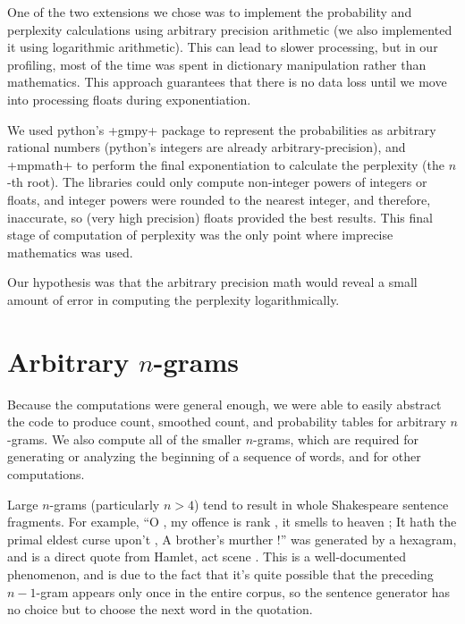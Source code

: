 \documentclass{article}
\newcommand{\osn}{\oldstylenums}
\begin{document}
		One of the two extensions we chose was to implement the probability and
		perplexity calculations using arbitrary precision arithmetic (we also
		implemented it using logarithmic arithmetic).  This can lead to slower
		processing, but in our profiling, most of the time was spent in
		dictionary manipulation rather than mathematics.  This approach
		guarantees that there is no data loss until we move into processing
		floats during exponentiation.

		We used python's +gmpy+ package to represent the probabilities as
		arbitrary rational numbers (python's integers are already
		arbitrary-precision), and +mpmath+ to perform the final exponentiation
		to calculate the perplexity (the $n$-th root).  The libraries could only
		compute non-integer powers of integers or floats, and integer powers
		were rounded to the nearest integer, and therefore, inaccurate, so
		(very high precision) floats provided the best results.  This final
		stage of computation of perplexity was the only point where imprecise
		mathematics was used.

		Our hypothesis was that the arbitrary precision math would reveal a
		small amount of error in computing the perplexity logarithmically.

	\section*{Arbitrary $n$-grams}
	
		Because the computations were general enough, we were able to easily
		abstract the code to produce count, smoothed count, and probability
		tables for arbitrary $n$-grams.  We also compute all of the smaller
		$n$-grams, which are required for generating or analyzing the beginning
		of a sequence of words, and for other computations.

		Large $n$-grams (particularly $n > 4$) tend to result in whole
		Shakespeare sentence fragments.  For example, ``O , my offence is rank ,
		it smells to heaven ; It hath the primal eldest curse upon't , A
		brother's murther !'' was generated by a hexagram, and is a direct quote
		from Hamlet, act \osn{3} scene \osn{3}.  This is a well-documented
		phenomenon, and is due to the fact that it's quite possible that the
		preceding $n-1$-gram appears only once in the entire corpus, so the
		sentence generator has no choice but to choose the next word in the
		quotation.
\end{document}
